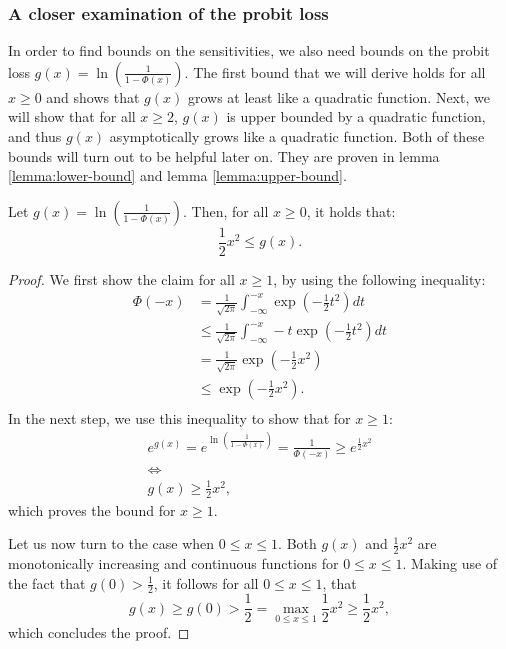 \subsubsection{A closer examination of the probit loss}

In order to find bounds on the sensitivities, we also
need bounds on the probit loss
$g(x) = \ln\left( \frac{1}{1 - \Phi(x)} \right)$.
The first bound that we will derive holds for all $x \geq 0$
and shows that $g(x)$ grows at least like a quadratic function.
Next, we will show that for all $x \geq 2$, $g(x)$ is upper
bounded by a quadratic function, and thus $g(x)$ asymptotically
grows like a quadratic function.
Both of these bounds will turn out to be helpful later
on. They are proven in lemma \ref{lemma:lower-bound}
and lemma \ref{lemma:upper-bound}.

\begin{lemma}
    \label{lemma:lower-bound}
    Let $g(x) = \ln \left( \frac{1}{1 - \Phi(x)}\right)$.
    Then, for all $x \geq 0$, it holds that:
    \begin{equation*}
        \frac{1}{2} x^2 \leq g(x).
    \end{equation*}
\end{lemma}
\begin{proof}
    We first show the claim for all $x \geq 1$, by using the following
    inequality:
    \begin{align*}
        \Phi(-x) & = \frac{1}{\sqrt{2 \pi}} \int_{-\infty}^{-x} \exp{ \left(-\frac{1}{2} t^2 \right)} dt       \\
                 & \leq \frac{1}{\sqrt{2 \pi}} \int_{-\infty}^{-x} -t \exp{ \left(-\frac{1}{2} t^2 \right)} dt \\
                 & = \frac{1}{\sqrt{2 \pi}} \exp{\left( -\frac{1}{2} x^2 \right)}                              \\
                 & \leq \exp{\left( -\frac{1}{2} x^2 \right)}.                                                 \\
    \end{align*}
    In the next step, we use this inequality to show that for $x \geq 1$:
    \begin{gather*}
        e^{g(x)} = e^{\ln \left( \frac{1}{1 - \Phi(x)} \right)} = \frac{1}{\Phi(-x)} \geq e^{\frac{1}{2} x^2}\\
        \iff \\
        g(x) \geq \frac{1}{2} x^2,
    \end{gather*}
    which proves the bound for $x \geq 1$.

    Let us now turn to the case when $0 \leq x \leq 1$.
    Both $g(x)$ and $\frac{1}{2}x^2$ are monotonically increasing
    and continuous functions for $0 \leq x \leq 1$.
    Making use of the fact that $g(0) > \frac{1}{2}$, it follows
    for all $0 \leq x \leq 1$, that
    \begin{equation*}
        g(x) \geq g(0) > \frac{1}{2} = \max_{0 \leq x \leq 1} \frac{1}{2} x^2 \geq \frac{1}{2} x^2,
    \end{equation*}
    which concludes the proof.
\end{proof}

